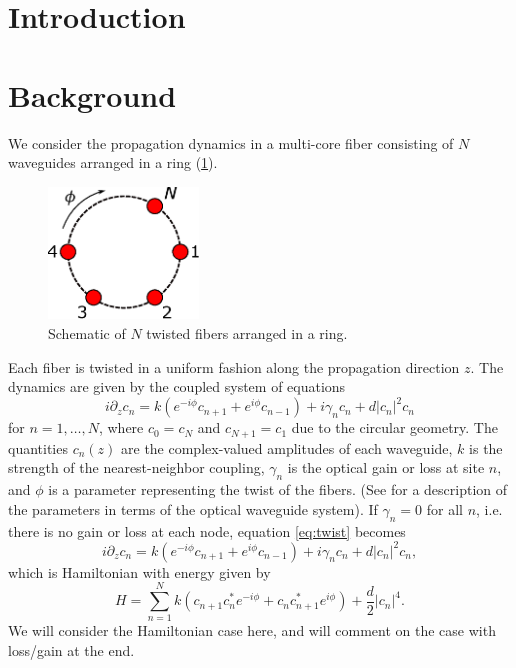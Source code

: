 \documentclass[12pt]{article}
\begin{document}
\section{Introduction}




\section{Background}

We consider the propagation dynamics in a multi-core fiber consisting of $N$ waveguides arranged in a ring (\cref{fig:ring}).
\begin{figure}[H]
\begin{center}
\includegraphics[width=4cm]{circle}
\end{center}
\caption{Schematic of $N$ twisted fibers arranged in a ring.}
\label{fig:ring}
\end{figure}
Each fiber is twisted in a uniform fashion along the propagation direction $z$. The dynamics are given by the coupled system of equations
\begin{equation}\label{eq:twist}
i \partial_z c_n = k \left(e^{-i\phi}c_{n+1} + e^{i\phi}c_{n-1}\right) + i \gamma_n c_n + d |c_n|^2 c_n 
\end{equation}
for $n = 1, \dots, N$, where $c_0 = c_{N}$ and $c_{N+1} = c_1$ due to the circular geometry. The quantities $c_n(z)$ are the complex-valued amplitudes of each waveguide, $k$ is the strength of the nearest-neighbor coupling, $\gamma_n$ is the optical gain or loss at site $n$, and $\phi$ is a parameter representing the twist of the fibers. (See \cite[(2.1)]{castro2016} for a description of the parameters in terms of the optical waveguide system). If $\gamma_n = 0$ for all $n$, i.e. there is no gain or loss at each node, equation \cref{eq:twist} becomes
\begin{equation}\label{eq:twist1}
i \partial_z c_n = k \left(e^{-i\phi}c_{n+1} + e^{i\phi}c_{n-1}\right) + i \gamma_n c_n + d |c_n|^2 c_n,
\end{equation}
which is Hamiltonian with energy given by
\begin{equation}
H = \sum_{n=1}^N k (c_{n+1}c_n^* e^{-i \phi} + c_n c_{n+1}^* e^{i \phi}) + \frac{d}{2}|c_n|^4.
\end{equation}
We will consider the Hamiltonian case here, and will comment on the case with loss/gain at the end.
\end{document}
